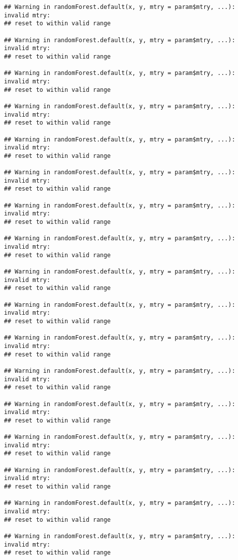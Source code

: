 \documentclass[
]{article}
\begin{document}
\begin{verbatim}
## Warning in randomForest.default(x, y, mtry = param$mtry, ...): invalid mtry:
## reset to within valid range

## Warning in randomForest.default(x, y, mtry = param$mtry, ...): invalid mtry:
## reset to within valid range

## Warning in randomForest.default(x, y, mtry = param$mtry, ...): invalid mtry:
## reset to within valid range

## Warning in randomForest.default(x, y, mtry = param$mtry, ...): invalid mtry:
## reset to within valid range

## Warning in randomForest.default(x, y, mtry = param$mtry, ...): invalid mtry:
## reset to within valid range

## Warning in randomForest.default(x, y, mtry = param$mtry, ...): invalid mtry:
## reset to within valid range

## Warning in randomForest.default(x, y, mtry = param$mtry, ...): invalid mtry:
## reset to within valid range

## Warning in randomForest.default(x, y, mtry = param$mtry, ...): invalid mtry:
## reset to within valid range

## Warning in randomForest.default(x, y, mtry = param$mtry, ...): invalid mtry:
## reset to within valid range

## Warning in randomForest.default(x, y, mtry = param$mtry, ...): invalid mtry:
## reset to within valid range

## Warning in randomForest.default(x, y, mtry = param$mtry, ...): invalid mtry:
## reset to within valid range

## Warning in randomForest.default(x, y, mtry = param$mtry, ...): invalid mtry:
## reset to within valid range

## Warning in randomForest.default(x, y, mtry = param$mtry, ...): invalid mtry:
## reset to within valid range

## Warning in randomForest.default(x, y, mtry = param$mtry, ...): invalid mtry:
## reset to within valid range

## Warning in randomForest.default(x, y, mtry = param$mtry, ...): invalid mtry:
## reset to within valid range

## Warning in randomForest.default(x, y, mtry = param$mtry, ...): invalid mtry:
## reset to within valid range

## Warning in randomForest.default(x, y, mtry = param$mtry, ...): invalid mtry:
## reset to within valid range


\end{verbatim}
\end{document}
